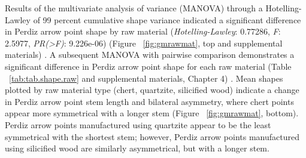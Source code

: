 \documentclass[review]{elsarticle}
\begin{document}
Results of the multivariate analysis of variance (MANOVA) through a Hotelling-Lawley of 99 percent cumulative shape variance indicated a significant difference in Perdiz arrow point shape by raw material (\textit{Hotelling-Lawley}: 0.77286, \textit{F}: 2.5977, \textit{PR(>F)}: 9.226e-06) (Figure ~\ref{fig:gmrawmat}, top and supplemental materials) \citep[Chapter 4]{RN8980}. A subsequent MANOVA with pairwise comparison demonstrates a significant difference in Perdiz arrow point shape for each raw material (Table ~\ref{tab:tab.shape.raw} and supplemental materials, Chapter 4) \citep{RN8980}. Mean shapes plotted by raw material type (chert, quartzite, silicified wood) indicate a change in Perdiz arrow point stem length and bilateral asymmetry, where chert points appear more symmetrical with a longer stem (Figure ~\ref{fig:gmrawmat}, bottom). Perdiz arrow points manufactured using quartzite appear to be the least symmetrical with the shortest stem; however, Perdiz arrow points manufactured using silicified wood are similarly asymmetrical, but with a longer stem.
\end{document}
